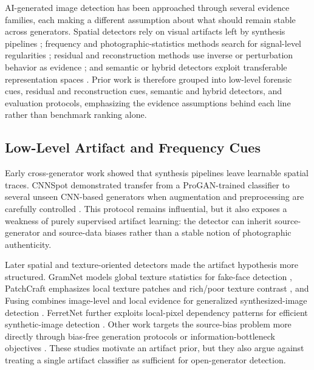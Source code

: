 \documentclass[letterpaper,journal]{IEEEtran}
\begin{document}
AI-generated image detection has been approached through several evidence families, each making a different assumption about what should remain stable across generators. Spatial detectors rely on visual artifacts left by synthesis pipelines \cite{wang2020cnnspot,liu2020gramnet,zhong2023patchcraft}; frequency and photographic-statistics methods search for signal-level regularities \cite{frank2020frequency,liu2022realimages,zhong2025beyond}; residual and reconstruction methods use inverse or perturbation behavior as evidence \cite{tan2023lgrad,tan2024npr,wang2023dire}; and semantic or hybrid detectors exploit transferable representation spaces \cite{radford2021clip,ojha2023univfd,yan2025aide,cheng2025cospy}. Prior work is therefore grouped into low-level forensic cues, residual and reconstruction cues, semantic and hybrid detectors, and evaluation protocols, emphasizing the evidence assumptions behind each line rather than benchmark ranking alone.

\subsection{Low-Level Artifact and Frequency Cues}
Early cross-generator work showed that synthesis pipelines leave learnable spatial traces. CNNSpot demonstrated transfer from a ProGAN-trained classifier to several unseen CNN-based generators when augmentation and preprocessing are carefully controlled \cite{wang2020cnnspot}. This protocol remains influential, but it also exposes a weakness of purely supervised artifact learning: the detector can inherit source-generator and source-data biases rather than a stable notion of photographic authenticity.

Later spatial and texture-oriented detectors made the artifact hypothesis more structured. GramNet models global texture statistics for fake-face detection \cite{liu2020gramnet}, PatchCraft emphasizes local texture patches and rich/poor texture contrast \cite{zhong2023patchcraft}, and Fusing combines image-level and local evidence for generalized synthesized-image detection \cite{ju2022fusing}. FerretNet further exploits local-pixel dependency patterns for efficient synthetic-image detection \cite{liang2025ferretnet}. Other work targets the source-bias problem more directly through bias-free generation protocols or information-bottleneck objectives \cite{guillaro2025biasfree,zhang2025vibnet}. These studies motivate an artifact prior, but they also argue against treating a single artifact classifier as sufficient for open-generator detection.
\end{document}
